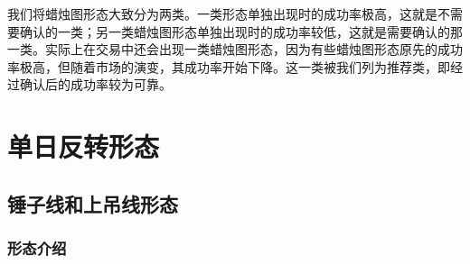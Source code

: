 我们将蜡烛图形态大致分为两类。一类形态单独出现时的成功率极高，这就是不需要确认的一类；另一类蜡烛图形态单独出现时的成功率较低，这就是需要确认的那一类。实际上在交易中还会出现一类蜡烛图形态，因为有些蜡烛图形态原先的成功率极高，但随着市场的演变，其成功率开始下降。这一类被我们列为推荐类，即经过确认后的成功率较为可靠。
\section{单日反转形态}
\subsection{锤子线和上吊线形态}
\subsubsection*{形态介绍}



